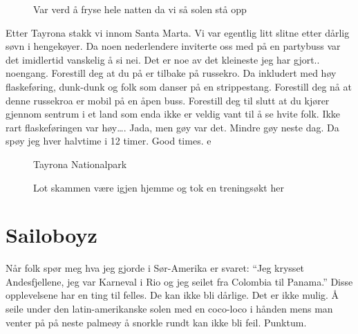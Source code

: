 \begin{figure}[H]
	\centering
	\noindent{}
	\caption*{Var verd å fryse hele natten da vi så solen stå opp}
	\label{fig:sovekolasj}
\end{figure}

Etter Tayrona stakk vi innom Santa Marta. Vi var egentlig litt slitne
etter dårlig søvn i hengekøyer. Da noen nederlendere inviterte oss med
på en partybuss var det imidlertid vanskelig å si nei. Det er
noe av det kleineste jeg har gjort.. noengang. Forestill deg at du på
er tilbake på russekro. Da inkludert med høy flaskeføring, dunk-dunk
og folk som danser på en strippestang. Forestill deg nå at denne russekroa er
mobil på en åpen buss. Forestill deg til slutt at du kjører gjennom
sentrum i et land som enda ikke er veldig vant til å se hvite folk. 
Ikke rart flaskeføringen var
høy\ldots. Jada, men gøy var det. Mindre gøy neste dag. Da spøy jeg
hver halvtime i 12 timer. Good times. e

\begin{figure}[H]
	\centering
	\noindent{}
\caption*{Tayrona Nationalpark}
	\label{fig:doisermaoasd}
\end{figure}
\clearpage
\begin{figure}[H]
	\centering
	\noindent{}
	\caption*{Lot skammen være igjen hjemme og tok en treningsøkt
	her}
	\label{fig:tayrona}
\end{figure}
\cleardoublepage
\section{Sailoboyz}

Når folk spør meg hva jeg gjorde i Sør-Amerika er svaret: ``Jeg
krysset Andesfjellene, jeg var  Karneval i Rio og jeg seilet fra Colombia
til Panama.'' Disse opplevelsene har en ting til felles. De kan ikke
bli dårlige. Det er ikke mulig. Å seile under den
latin-amerikanske solen med en coco-loco i hånden mens man venter på
på neste palmeøy å snorkle rundt kan ikke bli feil. Punktum.

